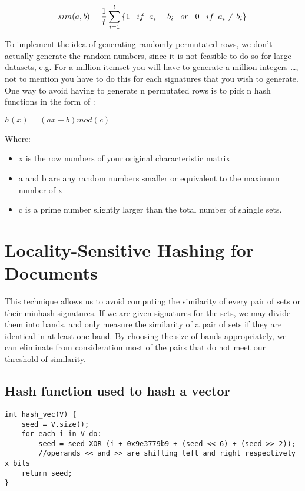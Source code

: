 \documentclass[12pt]{article}
\begin{document}
$$  sim(a,b) = \frac{1}{t} \sum_{i=1}^{t}\left\{
1  \; \; \;  if \; \;  a_{i} = b_{i} \\
\; \; \;  or \; \; \;  0 \; \; \;   if\: \;  a_{i} \neq  b_{i} 
\}\right.  $$


To implement the idea of generating randomly permutated rows, we don’t actually generate the random numbers, since it is not feasible to do so for large datasets, e.g. For a million itemset you will have to generate a million integers …, not to mention you have to do this for each signatures that you wish to generate. One way to avoid having to generate n permutated rows is to pick n hash functions in the form of :
\medbreak
\begin{center}
$ h(x)=(ax+b) mod(c)$
\end{center}

Where: 
\begin{itemize}
\item x is the row numbers of your original characteristic matrix
\item a and b are any random numbers smaller or equivalent to the maximum number of x 
\item c is a prime number slightly larger than the total number of shingle sets. 
\end{itemize}

\section{Locality-Sensitive Hashing for Documents}
 This technique allows us to avoid computing the similarity of every pair of sets or their minhash signatures. If we are given signatures for the sets, we may divide them into bands, and only measure the similarity of a pair of sets if they are identical in at least one band. By choosing the size of bands appropriately, we can eliminate from consideration most of the pairs that do not meet our threshold of similarity.
 \medskip 
 
\subsection{Hash function used to hash a vector}
 \begin{lstlisting}
int hash_vec(V) {
	seed = V.size();
	for each i in V do:
		seed = seed XOR (i + 0x9e3779b9 + (seed << 6) + (seed >> 2));	
		//operands << and >> are shifting left and right respectively x bits
	return seed;
}
\end{lstlisting}
 \medskip 
  
\end{document}
